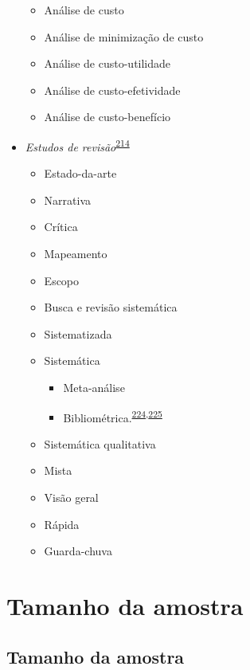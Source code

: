 \documentclass[
  a4paper,
]{book}
\begin{document}
\begin{itemize}
  \begin{itemize}
  \item
    Análise de custo
  \item
    Análise de minimização de custo
  \item
    Análise de custo-utilidade
  \item
    Análise de custo-efetividade
  \item
    Análise de custo-benefício
  \end{itemize}
\item
  \emph{Estudos de revisão}\textsuperscript{\protect\hyperlink{ref-Grant2009}{214}}

  \begin{itemize}
  \item
    Estado-da-arte
  \item
    Narrativa
  \item
    Crítica
  \item
    Mapeamento
  \item
    Escopo
  \item
    Busca e revisão sistemática
  \item
    Sistematizada
  \item
    Sistemática

    \begin{itemize}
    \item
      Meta-análise
    \item
      Bibliométrica.\textsuperscript{\protect\hyperlink{ref-donthu2021}{224},\protect\hyperlink{ref-lim2023}{225}}
    \end{itemize}
  \item
    Sistemática qualitativa
  \item
    Mista
  \item
    Visão geral
  \item
    Rápida
  \item
    Guarda-chuva
  \end{itemize}
\end{itemize}

\hypertarget{tamanho-amostral}{%
\chapter{\texorpdfstring{\textbf{Tamanho da amostra}}{Tamanho da amostra}}\label{tamanho-amostral}}

\hypertarget{tamanho-da-amostra}{%
\section{Tamanho da amostra}\label{tamanho-da-amostra}}
\end{document}
